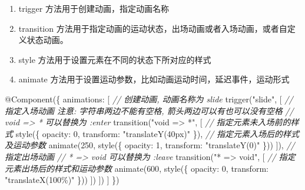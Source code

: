 \documentclass[
]{article}
\newenvironment{Shaded}{}{}
\newcommand{\CommentTok}[1]{\textcolor[rgb]{0.38,0.63,0.69}{\textit{#1}}}
\newcommand{\DataTypeTok}[1]{\textcolor[rgb]{0.56,0.13,0.00}{#1}}
\newcommand{\DecValTok}[1]{\textcolor[rgb]{0.25,0.63,0.44}{#1}}
\newcommand{\FunctionTok}[1]{\textcolor[rgb]{0.02,0.16,0.49}{#1}}
\newcommand{\NormalTok}[1]{#1}
\newcommand{\OperatorTok}[1]{\textcolor[rgb]{0.40,0.40,0.40}{#1}}
\newcommand{\StringTok}[1]{\textcolor[rgb]{0.25,0.44,0.63}{#1}}
\begin{document}
\begin{enumerate}
  \begin{enumerate}
  \def\labelenumii{\arabic{enumii}.}
  \item
    trigger 方法用于创建动画，指定动画名称
  \item
    transition
    方法用于指定动画的运动状态，出场动画或者入场动画，或者自定义状态动画。
  \item
    style 方法用于设置元素在不同的状态下所对应的样式
  \item
    animate 方法用于设置运动参数，比如动画运动时间，延迟事件，运动形式
  \end{enumerate}

\begin{Shaded}
\begin{Highlighting}[]
\NormalTok{@}\FunctionTok{Component}\NormalTok{(\{}
  \DataTypeTok{animations}\OperatorTok{:}\NormalTok{ [}
    \CommentTok{// 创建动画, 动画名称为 slide}
    \FunctionTok{trigger}\NormalTok{(}\StringTok{"slide"}\OperatorTok{,}\NormalTok{ [}
      \CommentTok{// 指定入场动画 注意: 字符串两边不能有空格, 箭头两边可以有也可以没有空格}
      \CommentTok{// void =\textgreater{} * 可以替换为 :enter}
      \FunctionTok{transition}\NormalTok{(}\StringTok{"void =\textgreater{} *"}\OperatorTok{,}\NormalTok{ [}
        \CommentTok{// 指定元素未入场前的样式}
        \FunctionTok{style}\NormalTok{(\{ }\DataTypeTok{opacity}\OperatorTok{:} \DecValTok{0}\OperatorTok{,} \DataTypeTok{transform}\OperatorTok{:} \StringTok{"translateY(40px)"}\NormalTok{ \})}\OperatorTok{,}
        \CommentTok{// 指定元素入场后的样式及运动参数}
        \FunctionTok{animate}\NormalTok{(}\DecValTok{250}\OperatorTok{,} \FunctionTok{style}\NormalTok{(\{ }\DataTypeTok{opacity}\OperatorTok{:} \DecValTok{1}\OperatorTok{,} \DataTypeTok{transform}\OperatorTok{:} \StringTok{"translateY(0)"}\NormalTok{ \}))}
\NormalTok{      ])}\OperatorTok{,}
      \CommentTok{// 指定出场动画}
      \CommentTok{// * =\textgreater{} void 可以替换为 :leave}
      \FunctionTok{transition}\NormalTok{(}\StringTok{"* =\textgreater{} void"}\OperatorTok{,}\NormalTok{ [}
        \CommentTok{// 指定元素出场后的样式和运动参数}
        \FunctionTok{animate}\NormalTok{(}\DecValTok{600}\OperatorTok{,} \FunctionTok{style}\NormalTok{(\{ }\DataTypeTok{opacity}\OperatorTok{:} \DecValTok{0}\OperatorTok{,} \DataTypeTok{transform}\OperatorTok{:} \StringTok{"translateX(100\%)"}\NormalTok{ \}))}
\NormalTok{      ])}
\NormalTok{    ])}
\NormalTok{  ]}
\NormalTok{\})}
\end{Highlighting}
\end{Shaded}


\end{enumerate}
\end{document}
